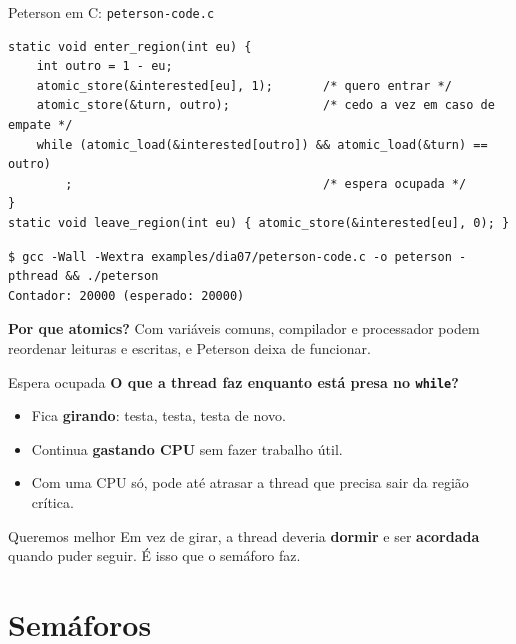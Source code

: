 \documentclass[aspectratio=169]{beamer}
\begin{document}
\begin{frame}[fragile]{Peterson em C: \texttt{peterson-code.c}}
\begin{lstlisting}[style=codigo]
static void enter_region(int eu) {
    int outro = 1 - eu;
    atomic_store(&interested[eu], 1);       /* quero entrar */
    atomic_store(&turn, outro);             /* cedo a vez em caso de empate */
    while (atomic_load(&interested[outro]) && atomic_load(&turn) == outro)
        ;                                   /* espera ocupada */
}
static void leave_region(int eu) { atomic_store(&interested[eu], 0); }
\end{lstlisting}

\begin{lstlisting}[style=terminal, basicstyle=\ttfamily\scriptsize\color{termfg}]
$ gcc -Wall -Wextra examples/dia07/peterson-code.c -o peterson -pthread && ./peterson
Contador: 20000 (esperado: 20000)
\end{lstlisting}

\small \textbf{Por que atomics?} Com variáveis comuns, compilador e processador podem reordenar leituras e escritas, e Peterson deixa de funcionar.
\end{frame}

\begin{frame}{Espera ocupada}
\textbf{O que a thread faz enquanto está presa no \texttt{while}?}

\pause
\begin{itemize}
    \item Fica \textbf{girando}: testa, testa, testa de novo.
    \item Continua \textbf{gastando CPU} sem fazer trabalho útil.
    \item Com uma CPU só, pode até atrasar a thread que precisa sair da região crítica.
\end{itemize}

\vspace{0.6em}
\begin{alertblock}{Queremos melhor}
Em vez de girar, a thread deveria \textbf{dormir} e ser \textbf{acordada} quando puder seguir. É isso que o semáforo faz.
\end{alertblock}
\end{frame}

\section{Semáforos}
\end{document}
